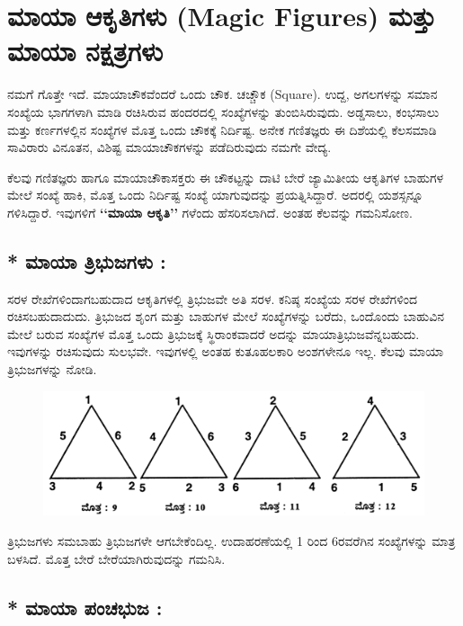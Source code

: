 
\chapter{ಮಾಯಾ ಆಕೃತಿಗಳು (Magic Figures) ಮತ್ತು ಮಾಯಾ ನಕ್ಷತ್ರಗಳು}

ನಮಗೆ ಗೊತ್ತೇ ಇದೆ. ಮಾಯಾಚೌಕವೆಂದರೆ ಒಂದು ಚೌಕ. ಚಚ್ಚೌಕ (Square). ಉದ್ದ, ಅಗಲಗಳನ್ನು ಸಮಾನ ಸಂಖ್ಯೆಯ ಭಾಗಗಳಾಗಿ ಮಾಡಿ ರಚಿಸಿರುವ ಹಂದರದಲ್ಲಿ ಸಂಖ್ಯೆಗಳನ್ನು ತುಂಬಿಸಿರುವುದು. ಅಡ್ಡಸಾಲು, ಕಂಭಸಾಲು ಮತ್ತು ಕರ್ಣಗಳಲ್ಲಿನ ಸಂಖ್ಯೆಗಳ ಮೊತ್ತ ಒಂದು ಚೌಕಕ್ಕೆ ನಿರ್ದಿಷ್ಟ. ಅನೇಕ ಗಣಿತಜ್ಞರು ಈ ದಿಶೆಯಲ್ಲಿ ಕೆಲಸಮಾಡಿ ಸಾವಿರಾರು ವಿನೂತನ, ವಿಶಿಷ್ಟ ಮಾಯಾಚೌಕಗಳನ್ನು ಪಡೆದಿರುವುದು ನಮಗೇ ವೇದ್ಯ.

ಕೆಲವು ಗಣಿತಜ್ಞರು ಹಾಗೂ ಮಾಯಾಚೌಕಾಸಕ್ತರು ಈ ಚೌಕಟ್ಟನ್ನು ದಾಟಿ ಬೇರೆ ಜ್ಯಾಮಿತೀಯ ಆಕೃತಿಗಳ ಬಾಹುಗಳ ಮೇಲೆ ಸಂಖ್ಯೆ ಹಾಕಿ, ಮೊತ್ತ ಒಂದು ನಿರ್ದಿಷ್ಟ ಸಂಖ್ಯೆ ಯಾಗುವುದನ್ನು ಪ್ರಯತ್ನಿಸಿದ್ದಾರೆ. ಅದರಲ್ಲಿ ಯಶಸ್ಸನ್ನೂ ಗಳಿಸಿದ್ದಾರೆ. ಇವುಗಳಿಗೆ \textbf{‘‘ಮಾಯಾ ಆಕೃತಿ’’} ಗಳೆಂದು ಹೆಸರಿಸಲಾಗಿದೆ. ಅಂತಹ ಕೆಲವನ್ನು ಗಮನಿಸೋಣ.

\section*{* ಮಾಯಾ ತ್ರಿಭುಜಗಳು :}

ಸರಳ ರೇಖೆಗಳಿಂದಾಗಬಹುದಾದ ಆಕೃತಿಗಳಲ್ಲಿ ತ್ರಿಭುಜವೇ ಅತಿ ಸರಳ. ಕನಿಷ್ಠ ಸಂಖ್ಯೆಯ ಸರಳ ರೇಖೆಗಳಿಂದ ರಚಿಸಬಹುದಾದುದು. ತ್ರಿಭುಜದ ಶೃಂಗ ಮತ್ತು ಬಾಹುಗಳ ಮೇಲೆ ಸಂಖ್ಯೆಗಳನ್ನು ಬರೆದು, ಒಂದೊಂದು ಬಾಹುವಿನ ಮೇಲೆ ಬರುವ ಸಂಖ್ಯೆಗಳ ಮೊತ್ತ ಒಂದು ತ್ರಿಭುಜಕ್ಕೆ ಸ್ಥಿರಾಂಕವಾದರೆ ಅದನ್ನು ಮಾಯಾತ್ರಿಭುಜವೆನ್ನಬಹುದು. ಇವುಗಳನ್ನು ರಚಿಸುವುದು ಸುಲಭವೇ. ಇವುಗಳಲ್ಲಿ ಅಂತಹ ಕುತೂಹಲಕಾರಿ ಅಂಶಗಳೇನೂ ಇಲ್ಲ. ಕೆಲವು ಮಾಯಾ ತ್ರಿಭುಜಗಳನ್ನು ನೋಡಿ.
\begin{figure}[H]
\includegraphics{src/figures/chap8/fig8-1.jpg}
\end{figure}

ತ್ರಿಭುಜಗಳು ಸಮಬಾಹು ತ್ರಿಭುಜಗಳೇ ಆಗಬೇಕೆಂದಿಲ್ಲ. ಉದಾಹರಣೆಯಲ್ಲಿ 1 ರಿಂದ 6ರವರೆಗಿನ ಸಂಖ್ಯೆಗಳನ್ನು ಮಾತ್ರ ಬಳಸಿದೆ. ಮೊತ್ತ ಬೇರೆ ಬೇರೆಯಾಗಿರುವುದನ್ನು ಗಮನಿಸಿ.

\section*{* ಮಾಯಾ ಪಂಚಭುಜ :}

